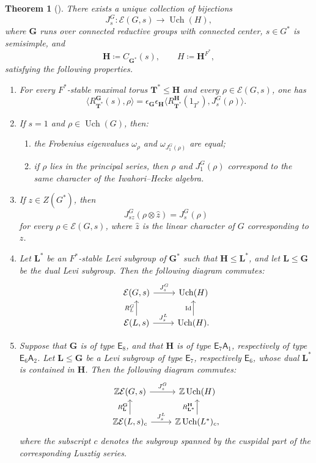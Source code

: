 \documentclass{amsart}
\theoremstyle{plain}
\numberwithin{equation}{section}
\newtheorem{theorem}{Theorem}[section]
\theoremstyle{definition}
\newcommand{\cE}{\mathcal{E}}
\newcommand{\Id}{\operatorname{Id}}
\newcommand{\Uch}{\operatorname{Uch}}
\newcommand{\bG}{\mathbf{G}}
\newcommand{\bL}{\mathbf{L}}
\newcommand{\bT}{\mathbf{T}}
\newcommand{\bH}{\mathbf{H}}
\newcommand{\A}{\mathsf{A}}
\newcommand{\fE}{\mathsf{E}}
\begin{document}
\begin{theorem}[{\cite[Theorem 7.1]{DM90}}]
\label{thm:JD-connected-center}
There exists a unique collection of bijections
\[
J_s^G:\cE(G,s)\longrightarrow \Uch(H),
\]
where \(\bG\) runs over connected reductive groups with connected center,
\(s\in G^*\) is semisimple, and
\[
\bH\coloneqq C_{\bG^*}(s),
\qquad
H\coloneqq \bH^{F^*},
\]
satisfying the following properties.

\begin{enumerate}
    \item For every \(F^*\)-stable maximal torus \(\bT^*\leq \bH\) and every
    \(\rho\in\cE(G,s)\), one has
    \[
    \langle R_{\bT^*}^{\bG}(s),\rho\rangle
    =
    \epsilon_{\bG}\epsilon_{\bH}
    \langle R_{\bT^*}^{\bH}(1_{T^*}),J_s^G(\rho)\rangle .
    \]

    \item If \(s=1\) and \(\rho\in\Uch(G)\), then:
    \begin{enumerate}
        \item[(a)] the Frobenius eigenvalues \(\omega_{\rho}\) and
        \(\omega_{J_1^G(\rho)}\) are equal;

        \item[(b)] if \(\rho\) lies in the principal series, then
        \(\rho\) and \(J_1^G(\rho)\) correspond to the same character of the
        Iwahori--Hecke algebra.
    \end{enumerate}

    \item If \(z\in Z(G^*)\), then
    \[
    J_{sz}^G(\rho\otimes\widehat z)=J_s^G(\rho)
    \]
    for every \(\rho\in\cE(G,s)\), where \(\widehat z\) is the linear character
    of \(G\) corresponding to \(z\).

    \item Let \(\bL^*\) be an \(F^*\)-stable Levi subgroup of \(\bG^*\) such
    that \(\bH\leq\bL^*\), and let \(\bL\leq\bG\) be the dual Levi subgroup.
    Then the following diagram commutes:
    \[
    \begin{tikzcd}
    \cE(G,s)\arrow{r}{J_s^G}
    & \Uch(H)  \\
    \cE(L,s) \arrow{u}{R_L^G}\arrow{r}{J_s^L}
    & \Uch(H)\arrow{u}{\Id}.
    \end{tikzcd}
    \]

    \item Suppose that \(\bG\) is of type \(\fE_8\), and that \(\bH\) is of
    type \(\fE_7\A_1\), respectively of type \(\fE_6\A_2\).  Let
    \(\bL\leq\bG\) be a Levi subgroup of type \(\fE_7\), respectively
    \(\fE_6\), whose dual \(\bL^*\) is contained in \(\bH\).  Then the
    following diagram commutes:
    \[
    \begin{tikzcd}
    \mathbb{Z}\cE(G,s)\arrow{r}{J_s^G}
    & \mathbb{Z}\Uch(H)  \\
    \mathbb{Z}\cE(L,s)_{c} \arrow{u}{R_{\bL}^{\bG}}\arrow{r}{J_s^L}
    & \mathbb{Z}\Uch(L^*)_{c}\arrow{u}{R_{\bL^*}^{\bH}},
    \end{tikzcd}
    \]
    where the subscript \(c\) denotes the subgroup spanned by the cuspidal
    part of the corresponding Lusztig series.


\end{enumerate}
\end{theorem}
\end{document}
